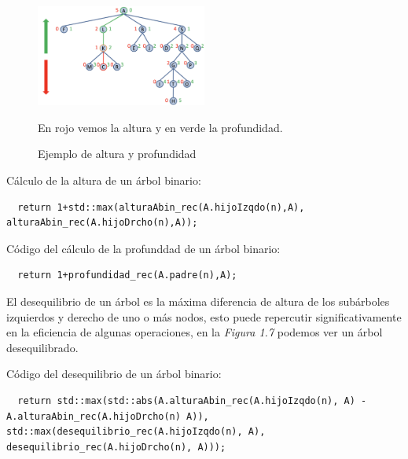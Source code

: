\begin{figure}[h]
  \begin{center}
    \includegraphics[width=0.5\textwidth]{assets/IntroArboles7.png}
  \end{center}
  \caption{Ejemplo de altura y profundidad}
  En rojo vemos la altura y en verde la profundidad.
\end{figure}

Cálculo de la altura de un árbol binario:
\begin{verbatim}
  return 1+std::max(alturaAbin_rec(A.hijoIzqdo(n),A), alturaAbin_rec(A.hijoDrcho(n),A));
\end{verbatim}
Código del cálculo de la profunddad de un árbol binario:
\begin{verbatim}
  return 1+profundidad_rec(A.padre(n),A);
\end{verbatim}

 El desequilibrio de un árbol es la máxima diferencia de altura de los subárboles izquierdos y derecho de uno o más nodos, esto puede repercutir significativamente en la eficiencia de algunas operaciones, en la \textit{Figura 1.7} podemos ver un árbol desequilibrado.

Código del desequilibrio de un árbol binario:
\begin{verbatim}
  return std::max(std::abs(A.alturaAbin_rec(A.hijoIzqdo(n), A) - A.alturaAbin_rec(A.hijoDrcho(n) A)), std::max(desequilibrio_rec(A.hijoIzqdo(n), A), desequilibrio_rec(A.hijoDrcho(n), A)));
\end{verbatim}
